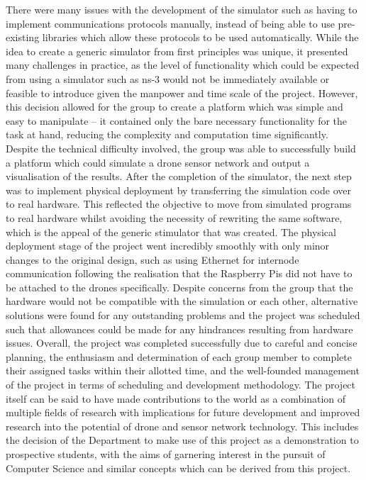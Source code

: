 There were many issues with the development of the simulator such as having to implement communications protocols manually, instead of being able to use pre-existing libraries which allow these protocols to be used automatically. While the idea to create a generic simulator from first principles was unique, it presented many challenges in practice, as the level of functionality which could be expected from using a simulator such as ns-3 would not be immediately available or feasible to introduce given the manpower and time scale of the project. However, this decision allowed for the group to create a platform which was simple and easy to manipulate – it contained only the bare necessary functionality for the task at hand, reducing the complexity and computation time significantly. Despite the technical difficulty involved, the group was able to successfully build a platform which could simulate a drone sensor network and output a visualisation of the results.
After the completion of the simulator, the next step was to implement physical deployment by transferring the simulation code over to real hardware. This reflected the objective to move from simulated programs to real hardware whilst avoiding the necessity of rewriting the same software, which is the appeal of the generic stimulator that was created. The physical deployment stage of the project went incredibly smoothly with only minor changes to the original design, such as using Ethernet for internode communication following the realisation that the Raspberry Pis did not have to be attached to the drones specifically. Despite concerns from the group that the hardware would not be compatible with the simulation or each other, alternative solutions were found for any outstanding problems and the project was scheduled such that allowances could be made for any hindrances resulting from hardware issues.
Overall, the project was completed successfully due to careful and concise planning, the enthusiasm and determination of each group member to complete their assigned tasks within their allotted time, and the well-founded management of the project in terms of scheduling and development methodology. The project itself can be said to have made contributions to the world as a combination of multiple fields of research with implications for future development and improved research into the potential of drone and sensor network technology. This includes the decision of the Department to make use of this project as a demonstration to prospective students, with the aims of garnering interest in the pursuit of Computer Science and similar concepts which can be derived from this project.
